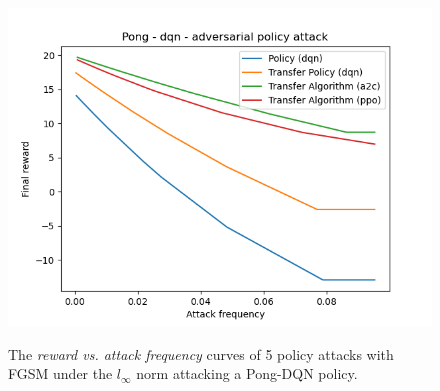 \begin{figure}
    {\includegraphics[width=0.49\linewidth]{images/exp1/dqn-pong-adversarial_policy.png}}
  \caption{The {\it reward vs. attack frequency} curves of 5 policy attacks with FGSM under the \(l_\infty\) norm attacking a Pong-DQN policy.}
  \label{figure:pong-dqn}
\end{figure}

